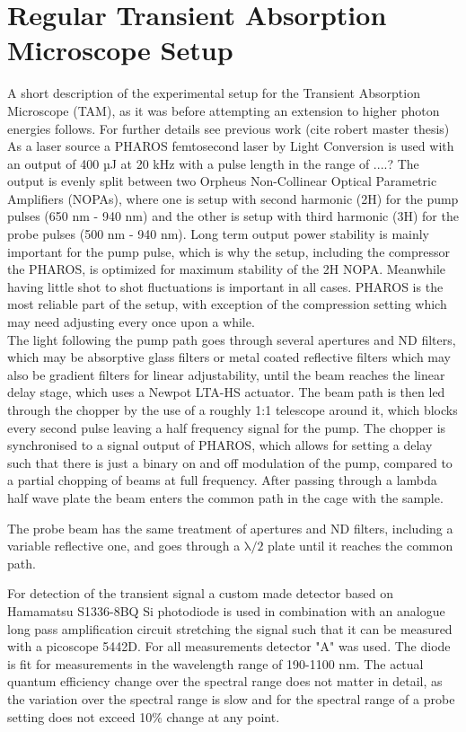 \documentclass[twoside,openright]{scrreprt}
\begin{document}
\section{Regular Transient Absorption Microscope Setup}\label{RegTAM}
A short description of the experimental setup for the Transient Absorption Microscope (TAM), as it was before attempting an extension to higher photon energies follows. For further details see previous work (cite robert master thesis)\\
As a laser source a PHAROS femtosecond laser by Light Conversion is used with an output of 400 µJ at 20 kHz with a pulse length in the range of ....? The output is evenly split between two Orpheus Non-Collinear Optical Parametric Amplifiers (NOPAs), where one is setup with second harmonic (2H) for the pump pulses (650 nm - 940 nm) and the other is setup with third harmonic (3H) for the probe pulses (500 nm - 940 nm). Long term output power stability is mainly important for the pump pulse, which is why the setup, including the compressor the PHAROS, is optimized for maximum stability of the 2H NOPA. Meanwhile having little shot to shot fluctuations is important in all cases. PHAROS is the most reliable part of the setup, with exception of the compression setting which may need adjusting every once upon a while.\\

The light following the pump path goes through several apertures and ND filters, which may be absorptive glass filters or metal coated reflective filters which may also be gradient filters for linear adjustability, until the beam reaches the linear delay stage, which uses a Newpot LTA-HS actuator. The beam path is then led through the chopper by the use of a roughly 1:1 telescope around it, which blocks every second pulse leaving a half frequency signal for the pump. The chopper is synchronised to a signal output of PHAROS, which allows for setting a delay such that there is just a binary on and off modulation of the pump, compared to a partial chopping of beams at full frequency. After passing through a lambda half wave plate the beam enters the common path in the cage with the sample.

The probe beam has the same treatment of apertures and ND filters, including a variable reflective one, and goes through a $\mathrm{\lambda/2}$ plate until it reaches the common path.


For detection of the transient signal a custom made detector based on Hamamatsu S1336-8BQ Si photodiode is used in combination with an analogue long pass amplification circuit stretching the signal such that it can be measured with a picoscope 5442D. For all measurements detector "A" was used. The diode is fit for measurements in the wavelength range of 190-1100 nm. The actual quantum efficiency change over the spectral range does not matter in detail, as the variation over the spectral range is slow and for the spectral range of a probe setting does not exceed 10\% change at any point.
\end{document}
